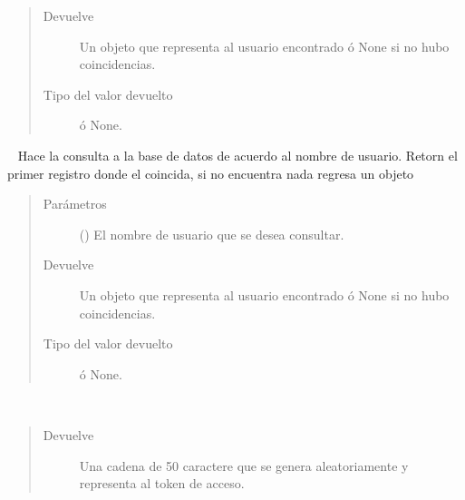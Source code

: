 \begin{fulllineitems}
\begin{fulllineitems}
\begin{quote}
\begin{description}
\item[{Devuelve}] \leavevmode
Un objeto  que representa al usuario encontrado ó None si no hubo coincidencias.

\item[{Tipo del valor devuelto}] \leavevmode
{} ó None.

\end{description}\end{quote}

\end{fulllineitems}


\begin{fulllineitems}
\label{\detokenize{chapter_two/desc_cloudnao:app.models.user_model.UserModel.find_by_username}}~
Hace la consulta a la base de datos de acuerdo al nombre de usuario.
Retorn el primer registro donde el  coincida, si no encuentra
nada regresa un objeto 
\begin{quote}\begin{description}
\item[{Parámetros}] \leavevmode
{} () \textendash{} El nombre de usuario que se desea consultar.

\item[{Devuelve}] \leavevmode
Un objeto  que representa al usuario encontrado ó None si no hubo coincidencias.

\item[{Tipo del valor devuelto}] \leavevmode
{} ó None.

\end{description}\end{quote}

\end{fulllineitems}


\begin{fulllineitems}
\label{\detokenize{chapter_two/desc_cloudnao:app.models.user_model.UserModel.generate_token}}~\begin{quote}\begin{description}
\item[{Devuelve}] \leavevmode
Una cadena de 50 caractere que se genera aleatoriamente y representa al token de acceso.


\end{description}
\end{quote}
\end{fulllineitems}
\end{fulllineitems}
